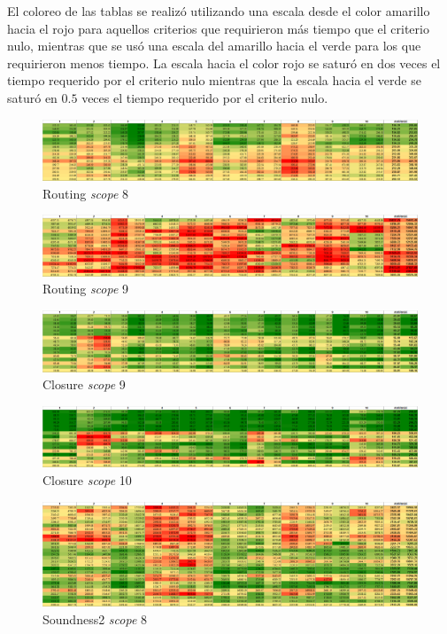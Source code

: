 El coloreo de las tablas se realizó utilizando una escala desde el color
amarillo hacia el rojo para aquellos criterios que requirieron más tiempo que
el criterio nulo, mientras que se usó una escala del amarillo hacia el verde
para los que requirieron menos tiempo. La escala hacia el color rojo se saturó
en dos veces el tiempo requerido por el criterio nulo mientras que la escala
hacia el verde se saturó en $0.5$ veces el tiempo requerido por el criterio nulo.

\begin{figure}
	\includegraphics[width=\textwidth]{resultados/p8_percha.png}
	\caption{Routing \emph{scope} 8}
	\label{perchap8}
\end{figure}

\begin{figure}
	\includegraphics[width=\textwidth]{resultados/p9_percha.png}
	\caption{Routing \emph{scope} 9}
\end{figure}

\begin{figure}
	\includegraphics[width=\textwidth]{resultados/k9_percha.png}
	\caption{Closure \emph{scope} 9}
\end{figure}

\begin{figure}
	\includegraphics[width=\textwidth]{resultados/k10_percha.png}
	\caption{Closure \emph{scope} 10}
\end{figure}

\begin{figure}
	\includegraphics[width=\textwidth]{resultados/soundness8_percha.png}
	\caption{Soundness2 \emph{scope} 8}
	\label{perchasound8}
\end{figure}

